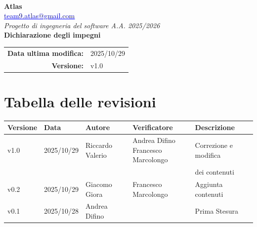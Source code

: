 \documentclass[a4paper,12pt]{article}
\makeatletter
\newcommand{\Gruppo}{Atlas}
\newcommand{\Email}{\href{mailto:team9.atlas@gmail.com}{\textcolor{blue}{\underline{team9.atlas@gmail.com}}}}
\newcommand{\TitoloUno}{Dichiarazione degli impegni}
\newcommand{\DataModifica}{2025/10/29}
\newcommand{\LogoGruppo}{img/AtlasLogo.png} %
\newcommand{\VersioneDocumento}{v1.0} %
\makeatother
\begin{document}
\begin{titlepage}
    \centering

    \vspace*{0cm}
    \\[0.8cm]

    {\LARGE \textbf{\Gruppo}}\\[0.1cm]
    {\large \Email}\\[1.2cm]

    {\Large \textit{Progetto di ingegneria del software A.A. 2025/2026}}\\[1.5cm]

    {\Huge \textbf{\TitoloUno}}\\[.5cm]

    \begin{tabular}{rl}
        \textbf{Data ultima modifica:} & \DataModifica \\
        \textbf{Versione:} & \VersioneDocumento \\
    \end{tabular}

\end{titlepage}


\section*{Tabella delle revisioni}
    \begin{center} 
        \begin{tabular}{|l|l|l|l|l|}
            \hline
            \textbf{Versione} & \textbf{Data} & \textbf{Autore} & \textbf{Verificatore} & \textbf{Descrizione} \\
            \hline
            v1.0 & 2025/10/29 & Riccardo Valerio & \makecell{Andrea Difino \\ Francesco Marcolongo} & Correzione e modifica\\
            &&&&dei contenuti\\
            \hline
            v0.2 & 2025/10/29 & Giacomo Giora & Francesco Marcolongo & Aggiunta contenuti \\
            \hline
            v0.1 & 2025/10/28 & Andrea Difino & & Prima Stesura \\
            \hline
        \end{tabular}
    \end{center}
\end{document}
